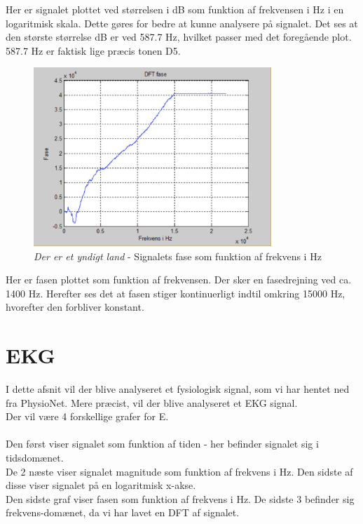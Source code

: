 Her er signalet plottet ved størrelsen i dB som funktion af frekvensen i Hz i en logaritmisk skala. Dette gøres for bedre at kunne analysere på signalet. Det ses at den største størrelse dB er ved 587.7 Hz, hvilket passer med det foregående plot. 587.7 Hz er faktisk lige præcis tonen D5. 

\begin{figure}[H]
	\centering
	\includegraphics[width=0.8\textwidth]{Figurer/Nationalsang4}
	\caption{\textit{Der er et yndigt land} - Signalets fase som funktion af frekvens i Hz}
\end{figure}

Her er fasen plottet som funktion af frekvensen. Der sker en fasedrejning ved ca. 1400 Hz. Herefter ses det at fasen stiger kontinuerligt indtil omkring 15000 Hz, hvorefter den forbliver konstant.


\chapter{EKG}
I dette afsnit vil der blive analyseret et fysiologisk signal, som vi har hentet ned fra PhysioNet. Mere præcist, vil der blive analyseret et EKG signal. \\
Der vil være 4 forskellige grafer for E.\\ \\
Den først viser signalet som funktion af tiden - her befinder signalet sig i tidsdomænet. \\
De 2 næste viser signalet magnitude som funktion af frekvens i Hz. Den sidste af disse viser signalet på en logaritmisk x-akse. \\
Den sidste graf viser fasen som funktion af frekvens i Hz. De sidste 3 befinder sig frekvens-domænet, da vi har lavet en DFT af signalet.


